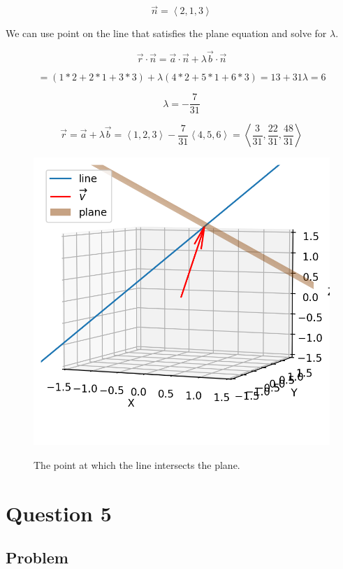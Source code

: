 \documentclass[12pt]{article}
\begin{document}
\[
    \vec{n} = \left\langle 2, 1, 3\right\rangle
\]

We can use point on the line that satisfies the plane equation and solve for \(\lambda \).

\[
    \vec{r} \cdot \vec{n} = \vec{a} \cdot \vec{n} + \lambda \vec{b} \cdot \vec{n}
\]

\[
    = (1*2 + 2*1 + 3*3) + \lambda (4*2 + 5*1 + 6*3) = 13 + 31 \lambda = 6
\]

\[
    \lambda = -\frac{7}{31}
\]

\[
    \vec{r} = \vec{a} + \lambda \vec{b} = \left\langle 1, 2, 3\right\rangle - \frac{7}{31}\left\langle 4, 5, 6\right\rangle
    = \left\langle \frac{3}{31}, \frac{22}{31}, \frac{48}{31}\right\rangle
\]

\begin{figure}[H]
    \includegraphics[width=\linewidth]{Q4.png}\label{fig:Q4}
    \caption{The point at which the line intersects the
        plane.\cite{El-Deeb_PEU-218_Assignments_py}}
\end{figure}

\section{Question 5}

\subsection{Problem}
\end{document}
